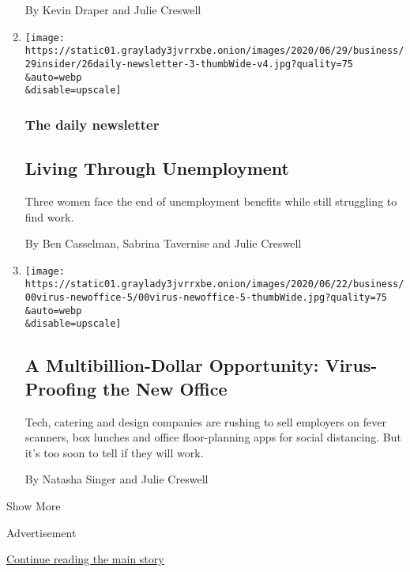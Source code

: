 \begin{enumerate}
  By Kevin Draper and Julie Creswell
\item
  \href{/2020/06/26/podcasts/daily-newsletter-unemployment-virus-education.html}{}

  \texttt{[image: https://static01.graylady3jvrrxbe.onion/images/2020/06/29/business/29insider/26daily-newsletter-3-thumbWide-v4.jpg?quality=75\\\&auto=webp\\\&disable=upscale]}

  \hypertarget{the-daily-newsletter}{%
  \subsubsection{The daily newsletter}\label{the-daily-newsletter}}

  \hypertarget{living-through-unemployment}{%
  \subsection{Living Through
  Unemployment}\label{living-through-unemployment}}

  Three women face the end of unemployment benefits while still
  struggling to find work.

  By Ben Casselman, Sabrina Tavernise and Julie Creswell
\item
  \href{/2020/06/22/business/virus-office-workplace-return.html}{}

  \texttt{[image: https://static01.graylady3jvrrxbe.onion/images/2020/06/22/business/00virus-newoffice-5/00virus-newoffice-5-thumbWide.jpg?quality=75\\\&auto=webp\\\&disable=upscale]}

  \hypertarget{a-multibillion-dollar-opportunity-virus-proofing-the-new-office}{%
  \subsection{A Multibillion-Dollar Opportunity: Virus-Proofing the New
  Office}\label{a-multibillion-dollar-opportunity-virus-proofing-the-new-office}}

  Tech, catering and design companies are rushing to sell employers on
  fever scanners, box lunches and office floor-planning apps for social
  distancing. But it's too soon to tell if they will work.

  By Natasha Singer and Julie Creswell
\end{enumerate}

Show More

Advertisement

\protect\hyperlink{after-mid2}{Continue reading the main story}

